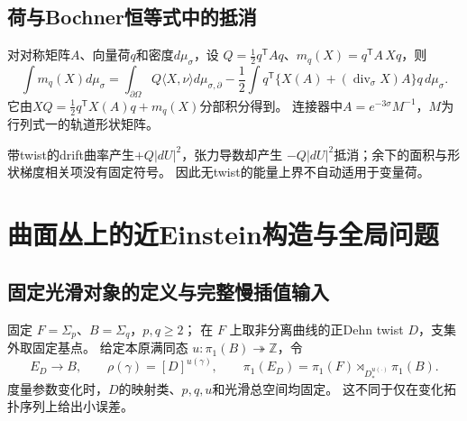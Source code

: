 \documentclass[UTF8,a4paper,11pt,fontset=fandol]{ctexart}
\numberwithin{equation}{section}
\theoremstyle{definition}
\begin{document}
\subsection{荷与Bochner恒等式中的抵消}
对对称矩阵$A$、向量荷$q$和密度$d\mu_\sigma$，设
$Q=\frac12q^{\mathsf T}Aq$、$m_q(X)=q^{\mathsf T}A\,Xq$，则
\begin{equation}\label{eq:charge}
\int m_q(X)d\mu_\sigma=
\int_{\partial\Omega}Q\langle X,\nu\rangle d\mu_{\sigma,\partial}
-\frac12\int q^{\mathsf T}\{X(A)+(\operatorname{div}_\sigma X)A\}q\,d\mu_\sigma.
\end{equation}
它由$XQ=\frac12q^{\mathsf T}X(A)q+m_q(X)$分部积分得到。
连接器中$A=e^{-3\sigma}M^{-1}$，$M$为行列式一的轨道形状矩阵。

带twist的drift曲率产生$+Q|dU|^2$，张力导数却产生
$-Q|dU|^2$抵消；余下的面积与形状梯度相关项没有固定符号。
因此无twist的能量上界不自动适用于变量荷。

\section{曲面丛上的近Einstein构造与全局问题}
\subsection{固定光滑对象的定义与完整慢插值输入}
固定 $F=\Sigma_p$、$B=\Sigma_q$，$p,q\ge2$；
在 $F$ 上取非分离曲线的正Dehn twist $D$，支集外取固定基点。
给定本原满同态 $u:\pi_1(B)\twoheadrightarrow\mathbb Z$，令
\[
 E_D\longrightarrow B,\qquad
 \rho(\gamma)=[D]^{u(\gamma)},\qquad
 \pi_1(E_D)=\pi_1(F)\rtimes_{D_*^{u(\cdot)}}\pi_1(B).
\]
度量参数变化时，$D$的映射类、$p,q,u$和光滑总空间均固定。
这不同于仅在变化拓扑序列上给出小误差。
\end{document}
